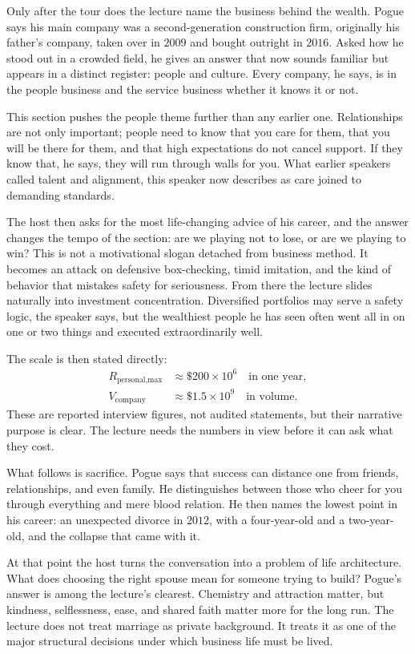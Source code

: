 Only after the tour does the lecture name the business behind the wealth. Pogue says his main company was a second-generation construction firm, originally his father's company, taken over in \(2009\) and bought outright in \(2016\). Asked how he stood out in a crowded field, he gives an answer that now sounds familiar but appears in a distinct register: people and culture. Every company, he says, is in the people business and the service business whether it knows it or not.

This section pushes the people theme further than any earlier one. Relationships are not only important; people need to know that you care for them, that you will be there for them, and that high expectations do not cancel support. If they know that, he says, they will run through walls for you. What earlier speakers called talent and alignment, this speaker now describes as care joined to demanding standards.

The host then asks for the most life-changing advice of his career, and the answer changes the tempo of the section: are we playing not to lose, or are we playing to win? This is not a motivational slogan detached from business method. It becomes an attack on defensive box-checking, timid imitation, and the kind of behavior that mistakes safety for seriousness. From there the lecture slides naturally into investment concentration. Diversified portfolios may serve a safety logic, the speaker says, but the wealthiest people he has seen often went all in on one or two things and executed extraordinarily well.

The scale is then stated directly:
\begin{align}
R_{\text{personal,max}} &\approx \$200\times 10^6 \quad \text{in one year},\\
V_{\text{company}} &\approx \$1.5\times 10^9 \quad \text{in volume}.
\end{align}
These are reported interview figures, not audited statements, but their narrative purpose is clear. The lecture needs the numbers in view before it can ask what they cost.

What follows is sacrifice. Pogue says that success can distance one from friends, relationships, and even family. He distinguishes between those who cheer for you through everything and mere blood relation. He then names the lowest point in his career: an unexpected divorce in \(2012\), with a four-year-old and a two-year-old, and the collapse that came with it.

At that point the host turns the conversation into a problem of life architecture. What does choosing the right spouse mean for someone trying to build? Pogue's answer is among the lecture's clearest. Chemistry and attraction matter, but kindness, selflessness, ease, and shared faith matter more for the long run. The lecture does not treat marriage as private background. It treats it as one of the major structural decisions under which business life must be lived.

